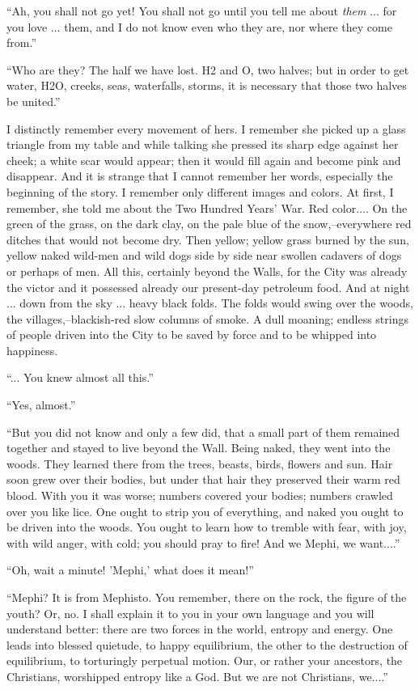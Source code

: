 \documentclass[11pt,openany]{book}
\begin{document}
``Ah, you shall not go yet! You shall not go until you tell me about \emph{them} ... for you love ... them, and I do not know even who they are, nor where they come from.''

``Who are they? The half we have lost. H2 and O, two halves; but in order to get water, H2O, creeks, seas, waterfalls, storms, it is necessary that those two halves be united.''

I distinctly remember every movement of hers. I remember she picked up a glass triangle from my table and while talking she pressed its sharp edge against her cheek; a white scar would appear; then it would fill again and become pink and disappear. And it is strange that I cannot remember her words, especially the beginning of the story. I remember only different images and colors. At first, I remember, she told me about the Two Hundred Years' War. Red color.... On the green of the grass, on the dark clay, on the pale blue of the snow,--everywhere red ditches that would not become dry. Then yellow; yellow grass burned by the sun, yellow naked wild-men and wild dogs side by side near swollen cadavers of dogs or perhaps of men. All this, certainly beyond the Walls, for the City was already the victor and it possessed already our present-day petroleum food. And at night ... down from the sky ... heavy black folds. The folds would swing over the woods, the villages,--blackish-red slow columns of smoke. A dull moaning; endless strings of people driven into the City to be saved by force and to be whipped into happiness.

``... You knew almost all this.''

``Yes, almost.''

``But you did not know and only a few did, that a small part of them remained together and stayed to live beyond the Wall. Being naked, they went into the woods. They learned there from the trees, beasts, birds, flowers and sun. Hair soon grew over their bodies, but under that hair they preserved their warm red blood. With you it was worse; numbers covered your bodies; numbers crawled over you like lice. One ought to strip you of everything, and naked you ought to be driven into the woods. You ought to learn how to tremble with fear, with joy, with wild anger, with cold; you should pray to fire! And we Mephi, we want....''

``Oh, wait a minute! 'Mephi,' what does it mean!''

``Mephi? It is from Mephisto. You remember, there on the rock, the figure of the youth? Or, no. I shall explain it to you in your own language and you will understand better: there are two forces in the world, entropy and energy. One leads into blessed quietude, to happy equilibrium, the other to the destruction of equilibrium, to torturingly perpetual motion. Our, or rather your ancestors, the Christians, worshipped entropy like a God. But we are not Christians, we....''
\end{document}
